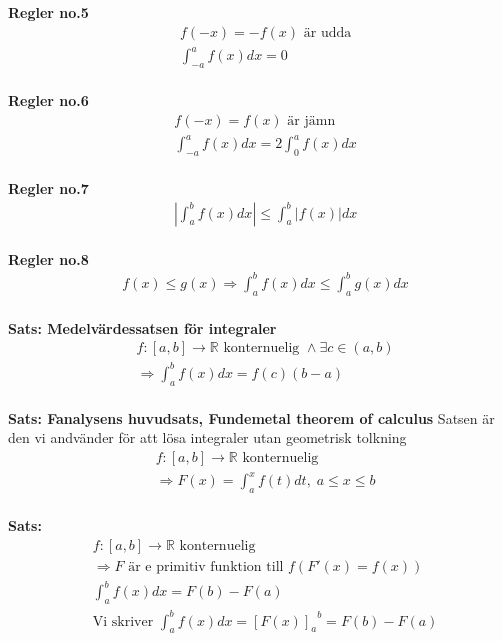 \begin{multicols}{2}
\textbf{Regler no.5}
\begin{align*}
  &f(-x)=-f(x) \text{ är udda} \\
  &\int_{-a}^a f(x)dx = 0 \\
\end{align*}

\textbf{Regler no.6}
\begin{align*}
  &f(-x)=f(x) \text{ är jämn} \\
  &\int_{-a}^a f(x)dx = 2 \int_0^a f(x)dx \\
\end{align*}

\textbf{Regler no.7}
\begin{align*}
  &\left| \int_a^b f(x)dx \right| \leq \int_a^b |f(x)|dx \\
\end{align*}

\textbf{Regler no.8}
\begin{align*}
  &f(x) \leq g(x) \Rightarrow \int_a^b f(x)dx \leq \int_a^b g(x)dx \\
\end{align*}


\textbf{Sats: Medelvärdessatsen för integraler}
\begin{align*}
  &f:[a,b]\to\mathbb{R} \text{ konternuelig }\land\exists c\in(a,b) \\
  &\Rightarrow \int_a^{b}f(x)dx=f(c)(b-a) \\
\end{align*}

\textbf{Sats: Fanalysens huvudsats, Fundemetal theorem of calculus} \newline
Satsen är den vi andvänder för att lösa integraler utan geometrisk tolkning
\begin{align*}
  &f:[a,b]\to\mathbb{R} \text{ konternuelig } \\
  &\Rightarrow F(x)=\int_a^x f(t)dt, \; a\leq x\leq b \\
\end{align*}

\textbf{Sats: }
\begin{align*}
  &f:[a,b]\to\mathbb{R} \text{ konternuelig } \\
  &\Rightarrow F \text{ är e primitiv funktion till } f(F'(x)=f(x)) \\
  &\int_a^b f(x)dx=F(b)-F(a) \\
  &\text{Vi skriver } \int_a^b f(x)dx={{[F(x)]}_a}^b=F(b)-F(a) \\
\end{align*}


\end{multicols}
